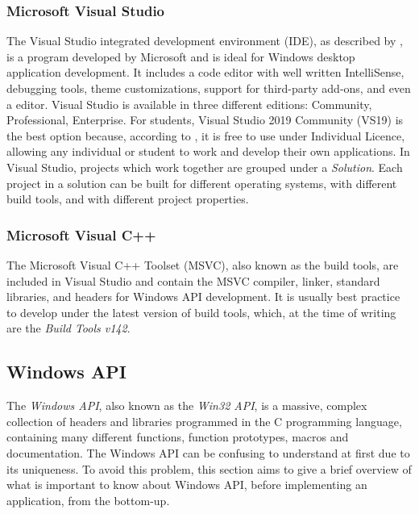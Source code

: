 \subsubsection{Microsoft Visual Studio}
\label{ch2vs19}
The Visual Studio integrated development environment (IDE), as described by \cite{VStudio}, is a program developed by Microsoft and is ideal for Windows desktop application development. It includes a code editor with well written IntelliSense, debugging tools, theme customizations, support for third-party add-ons, and even a editor. Visual Studio is available in three different editions: Community, Professional, Enterprise. For students, Visual Studio 2019 Community (VS19) is the best option because, according to \cite{VS19TOS}, it is free to use under Individual Licence, allowing any individual or student to work and develop their own applications. In Visual Studio, projects which work together are grouped under a \textit{Solution}. Each project in a solution can be built for different operating systems, with different build tools, and with different project properties.

\subsubsection{Microsoft Visual C++}
\label{ch2msvc}
The Microsoft Visual C++ Toolset (MSVC), also known as the build tools, are included in Visual Studio and contain the MSVC compiler, linker, standard libraries, and headers for Windows API development.\cite{MsVc} It is usually best practice to develop under the latest version of build tools, which, at the time of writing are the \textit{Build Tools v142}.

\subsection{Windows API}
The \textit{Windows API}, also known as the \textit{Win32 API}, is a massive, complex collection of headers and libraries programmed in the C programming language, containing many different functions, function prototypes, macros and documentation. The Windows API can be confusing to understand at first due to its uniqueness. To avoid this problem, this section aims to give a brief overview of what is important to know about Windows API, before implementing an application, from the bottom-up.

